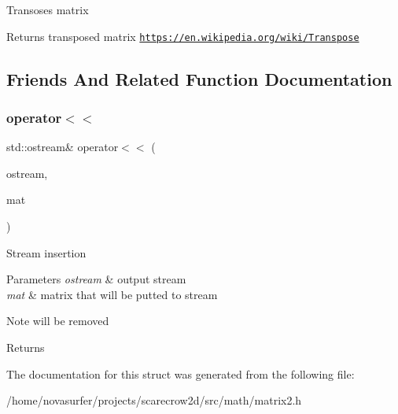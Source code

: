 Transoses matrix \begin{DoxyReturn}{Returns}
transposed matrix  \href{https://en.wikipedia.org/wiki/Transpose}{\tt https\+://en.\+wikipedia.\+org/wiki/\+Transpose} 
\end{DoxyReturn}


\subsection{Friends And Related Function Documentation}
\mbox{\label{structmath_1_1mat2_a651162fc04bdf7d98bdf9b7586443e5c}} 
\subsubsection{\texorpdfstring{operator$<$$<$}{operator<<}}
{\footnotesize\ttfamily std\+::ostream\& operator$<$$<$ (\begin{DoxyParamCaption}\item[{std\+::ostream \&}]{ostream,  }\item[{const \hyperlink{structmath_1_1mat2}{mat2} \&}]{mat }\end{DoxyParamCaption})\hspace{0.3cm}{\ttfamily [friend]}}

Stream insertion 
\begin{DoxyParams}{Parameters}
{\em ostream} & output stream \\
\hline
{\em mat} & matrix that will be putted to stream \\
\hline
\end{DoxyParams}
\begin{DoxyNote}{Note}
will be removed 
\end{DoxyNote}
\begin{DoxyReturn}{Returns}

\end{DoxyReturn}


The documentation for this struct was generated from the following file\+:\begin{DoxyCompactItemize}
\item 
/home/novasurfer/projects/scarecrow2d/src/math/matrix2.\+h\end{DoxyCompactItemize}

